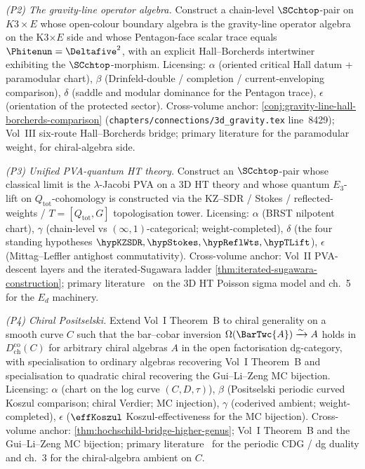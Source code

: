 \begin{remark}
\emph{(P2) The gravity-line operator algebra.}
Construct a chain-level $\SCchtop$-pair on $K3\times E$ whose
open-colour boundary algebra is the gravity-line operator algebra
on the K3$\times E$ side and whose Pentagon-face scalar trace
equals $\Phitenun = \Deltafive^{2}$, with an explicit
Hall--Borcherds intertwiner exhibiting the
$\SCchtop$-morphism. Licensing: $\alpha$ (oriented critical Hall
datum + paramodular chart), $\beta$ (Drinfeld-double / completion
/ current-enveloping comparison), $\delta$ (saddle and modular
dominance for the Pentagon trace), $\epsilon$ (orientation of
the protected sector). Cross-volume anchor:
\cref{conj:gravity-line-hall-borcherds-comparison}
(\texttt{chapters/connections/3d\_gravity.tex} line~8429); Vol~III
six-route Hall--Borcherds bridge; primary literature
\cite{Borcherds1995,Gritsenko1999} for the paramodular weight,
\cite{BD04} for chiral-algebra side.

\emph{(P3) Unified PVA-quantum HT theory.}
Construct an $\SCchtop$-pair whose classical limit is the
$\lambda$-Jacobi PVA on a 3D HT theory and whose quantum
$E_3$-lift on $Q_{\mathrm{tot}}$-cohomology is constructed via the
KZ--SDR / Stokes / reflected-weights / $T = [Q_{\mathrm{tot}},
G]$ topologisation tower. Licensing: $\alpha$ (BRST nilpotent
chart), $\gamma$ (chain-level vs $(\infty,1)$-categorical;
weight-completed), $\delta$ (the four standing hypotheses
$\hypKZSDR, \hypStokes, \hypReflWts, \hypTLift$), $\epsilon$
(Mittag--Leffler antighost commutativity). Cross-volume anchor:
Vol~II PVA-descent layers and the iterated-Sugawara ladder
\cref{thm:iterated-sugawara-construction}; primary
literature~\cite{KZ25} on the 3D HT Poisson sigma model and
\cite{HA} ch.~5 for the $E_d$ machinery.

\emph{(P4) Chiral Positselski.}
Extend Vol~I Theorem~B to chiral generality on a smooth curve
$C$ such that the bar--cobar inversion
$\Omega(\BarTwc{A}) \xrightarrow{\sim} A$ holds in
$D^{\mathrm{co}}_{\mathrm{ch}}(C)$ for arbitrary chiral
algebras $A$ in the open factorisation dg-category, with
specialisation to ordinary algebras recovering Vol~I
Theorem~B and specialisation to quadratic chiral recovering the
Gui--Li--Zeng MC bijection. Licensing: $\alpha$ (chart on the
log curve $(C, D, \tau)$), $\beta$ (Positselski periodic
curved Koszul comparison; chiral Verdier; MC injection),
$\gamma$ (coderived ambient; weight-completed),
$\epsilon$ ($\effKoszul$ Koszul-effectiveness for the MC
bijection). Cross-volume anchor:
\cref{thm:hochschild-bridge-higher-genus}; Vol~I Theorem~B and the
Gui--Li--Zeng MC bijection; primary
literature~\cite{Positselski11,Positselski18} for the periodic
CDG / dg duality and \cite{BD04} ch.~3 for the chiral-algebra
ambient on $C$.


\end{remark}
